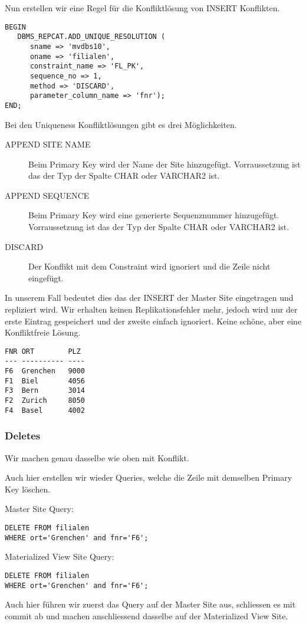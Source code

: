 \documentclass[11pt,a4paper,parskip=half]{scrartcl}
\begin{document}
Nun erstellen wir eine Regel für die Konfliktlösung von INSERT Konflikten.
\begin{lstlisting}
BEGIN
   DBMS_REPCAT.ADD_UNIQUE_RESOLUTION (
      sname => 'mvdbs10',
      oname => 'filialen',
      constraint_name => 'FL_PK',
      sequence_no => 1,
      method => 'DISCARD',
      parameter_column_name => 'fnr');
END;
\end{lstlisting}
Bei den Uniqueness Konfliktlösungen gibt es drei Möglichkeiten.
\begin{description}
	\item[APPEND SITE NAME] Beim Primary Key wird der Name der Site hinzugefügt. Vorraussetzung ist das der Typ der Spalte CHAR oder VARCHAR2 ist.
	\item[APPEND SEQUENCE] Beim Primary Key wird eine generierte Sequenznummer hinzugefügt.  Vorraussetzung ist das der Typ der Spalte CHAR oder VARCHAR2 ist.
	\item[DISCARD] Der Konflikt mit dem Constraint wird ignoriert und die Zeile nicht eingefügt. 
\end{description}
In unserem Fall bedeutet dies das der INSERT der Master Site eingetragen und repliziert wird. Wir erhalten keinen Replikationsfehler mehr, jedoch wird nur der erste Eintrag gespeichert und der zweite einfach ignoriert. Keine schöne, aber eine Konfliktfreie Lösung.
\begin{lstlisting}
FNR ORT        PLZ
--- ---------- ----
F6  Grenchen   9000 
F1  Biel       4056 
F3  Bern       3014 
F2  Zurich     8050 
F4  Basel      4002 
\end{lstlisting}

\subsubsection{Deletes}
Wir machen genau dasselbe wie oben mit Konflikt.

Auch hier erstellen wir wieder Queries, welche die Zeile mit demselben Primary Key löschen.

Master Site Query:
\begin{lstlisting}
DELETE FROM filialen
WHERE ort='Grenchen' and fnr='F6'; 
\end{lstlisting}

Materialized View Site Query:
\begin{lstlisting}
DELETE FROM filialen
WHERE ort='Grenchen' and fnr='F6'; 
\end{lstlisting}

Auch hier führen wir zuerst das Query auf der Master Site aus, schliessen es mit commit ab und machen anschliessend dasselbe auf der Materialized View Site.
\end{document}
